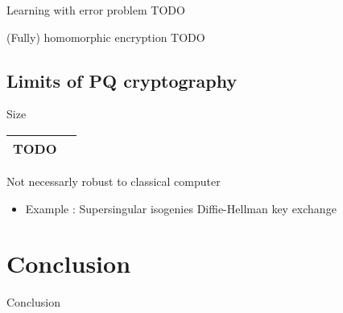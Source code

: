 \documentclass{beamer}
\begin{document}
\begin{frame}{Learning with error problem}
	TODO
\end{frame}

\begin{frame}{(Fully) homomorphic encryption}
	TODO
\end{frame}

\subsection{Limits of PQ cryptography}
\begin{frame}
	Size
	\begin{tabular}{|c|c|}
		\hline
		TODO & \\
		\hline
	\end{tabular}
\end{frame}

\begin{frame}{Not necessarly robust to classical computer}
	\begin{itemize}
		\item Example : Supersingular isogenies Diffie-Hellman key exchange
	\end{itemize}
\end{frame}

\section{Conclusion}
\begin{frame}{Conclusion}
\begin{linenumbers}
\end{linenumbers}
\end{frame}
\end{document}
